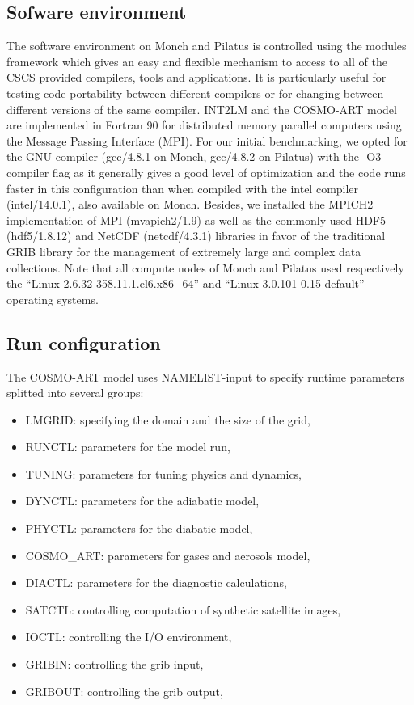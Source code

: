 \subsection{Sofware environment}
\label{subsec:3.1}
The software environment on Monch  and Pilatus is controlled using the
modules framework which gives an easy and flexible mechanism to access
to all of the CSCS  provided compilers, tools and applications.  It is
particularly  useful for  testing code  portability  between different
compilers  or for  changing  between different  versions  of the  same
compiler.  INT2LM  and the COSMO-ART model are  implemented in Fortran
90 for distributed memory parallel computers using the Message Passing
Interface (MPI).  For  our initial benchmarking, we opted  for the GNU
compiler  (gcc/4.8.1 on  Monch,  gcc/4.8.2 on  Pilatus)  with the  -O3
compiler flag as  it generally gives a good  level of optimization and
the code runs faster in this configuration than when compiled with the
intel compiler  (intel/14.0.1), also available on  Monch.  Besides, we
installed the  MPICH2 implementation of MPI (mvapich2/1.9)  as well as
the  commonly  used   HDF5  (hdf5/1.8.12)  and  NetCDF  (netcdf/4.3.1)
libraries in favor of the  traditional GRIB library for the management
of  extremely  large and  complex  data  collections.   Note that  all
compute  nodes of  Monch  and Pilatus  used  respectively the  ``Linux
2.6.32-358.11.1.el6.x86\_64''   and   ``Linux   3.0.101-0.15-default''
operating systems.

\subsection{Run configuration}
\label{subsec:3.2}
The COSMO-ART model uses NAMELIST-input to specify runtime parameters
splitted into several groups:

\begin{itemize}
\item LMGRID: specifying the domain and the size of the grid,
\item RUNCTL: parameters for the model run,
\item TUNING: parameters for tuning physics and dynamics,
\item DYNCTL: parameters for the adiabatic model,
\item PHYCTL: parameters for the diabatic model,
\item COSMO\_ART: parameters for gases and aerosols model,
\item DIACTL: parameters for the diagnostic calculations,
\item SATCTL: controlling computation of synthetic satellite images,
\item IOCTL: controlling the I/O environment,
\item GRIBIN: controlling the grib input,
\item GRIBOUT: controlling the grib output,
\end{itemize}


